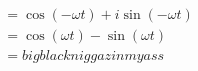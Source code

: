 \documentclass[preview]{standalone}
\begin{document}
\begin{align*}
&=\cos{(-\omega t)}+i\sin{(-\omega t)} \\ &= \cos{(\omega t)}-\sin{(\omega t)} \\ &= big black niggaz in my ass
\end{align*}
\end{document}
